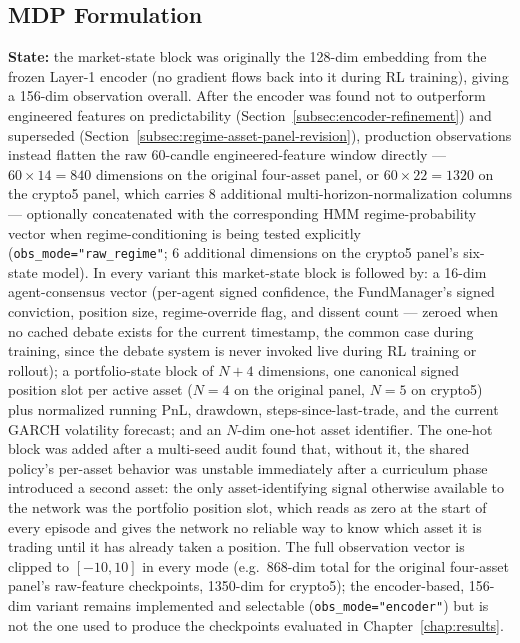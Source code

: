 \subsection{MDP Formulation}
\label{subsec:rl-mdp}

\textbf{State:} the market-state block was originally the 128-dim embedding from the frozen Layer-1 encoder (no gradient flows back into it during RL training), giving a 156-dim observation overall. After the encoder was found not to outperform engineered features on predictability (Section~\ref{subsec:encoder-refinement}) and superseded (Section~\ref{subsec:regime-asset-panel-revision}), production observations instead flatten the raw 60-candle engineered-feature window directly --- $60 \times 14 = 840$ dimensions on the original four-asset panel, or $60 \times 22 = 1320$ on the crypto5 panel, which carries 8 additional multi-horizon-normalization columns --- optionally concatenated with the corresponding HMM regime-probability vector when regime-conditioning is being tested explicitly (\texttt{obs\_mode="raw\_regime"}; 6 additional dimensions on the crypto5 panel's six-state model). In every variant this market-state block is followed by: a 16-dim agent-consensus vector (per-agent signed confidence, the FundManager's signed conviction, position size, regime-override flag, and dissent count --- zeroed when no cached debate exists for the current timestamp, the common case during training, since the debate system is never invoked live during RL training or rollout); a portfolio-state block of $N{+}4$ dimensions, one canonical signed position slot per active asset ($N=4$ on the original panel, $N=5$ on crypto5) plus normalized running PnL, drawdown, steps-since-last-trade, and the current GARCH volatility forecast; and an $N$-dim one-hot asset identifier. The one-hot block was added after a multi-seed audit found that, without it, the shared policy's per-asset behavior was unstable immediately after a curriculum phase introduced a second asset: the only asset-identifying signal otherwise available to the network was the portfolio position slot, which reads as zero at the start of every episode and gives the network no reliable way to know which asset it is trading until it has already taken a position. The full observation vector is clipped to $[-10, 10]$ in every mode (e.g.\ 868-dim total for the original four-asset panel's raw-feature checkpoints, 1350-dim for crypto5); the encoder-based, 156-dim variant remains implemented and selectable (\texttt{obs\_mode="encoder"}) but is not the one used to produce the checkpoints evaluated in Chapter~\ref{chap:results}.

